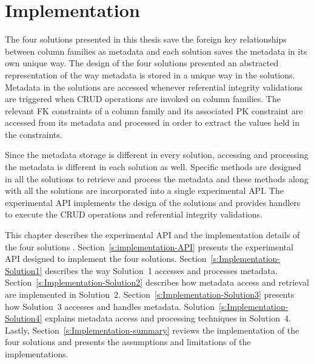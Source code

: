 \chapter{Implementation} \label{c:Implementation}

The four solutions presented in this thesis save the foreign key relationships
between column families as metadata and each solution saves the metadata in its
own unique way.  The design of the four solutions presented  an abstracted
representation of the way metadata is stored in a unique way in the solutions.
Metadata in the solutions are accessed whenever referential integrity
validations are triggered when \ac{CRUD} operations are invoked on column
families. The relevant  \ac{FK} constraints of a column family and
its associated \ac{PK} constraint are accessed from its metadata and processed
in order to extract the values held in the constraints. 

Since the metadata storage is different in
every solution, accessing and processing the  metadata is different in each
solution as well. 
Specific methods are designed in all the solutions to retrieve and process the
metadata and these methods along with all the
solutions are incorporated into a single experimental \ac{API}. The
experimental \ac{API} implements the design of the solutions and provides
handlers to execute the \ac{CRUD} operations and referential
integrity validations. 

This chapter describes  the experimental \ac{API} and
the implementation details of the  four solutions .
Section~\ref{s:implementation-API} presents the experimental \ac{API} designed
to implement the four solutions. Section~\ref{s:Implementation-Solution1} describes
the way Solution~1 accesses and processes metadata.
Section~\ref{s:Implementation-Solution2} describes how metadata access and
retrieval are implemented in Solution~2.
Section~\ref{s:Implementation-Solution3} presents how Solution~3 accesses and
handles metadata.
Solution~\ref{s:Implementation-Solution4} explains metadata access and
processing techniques in Solution~4. Lastly,
Section~\ref{s:Implementation-summary} reviews the implementation of the four
solutions and presents the assumptions and limitations of the implementations.
 


	




